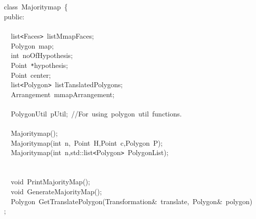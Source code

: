 \documentclass[a4paper,10pt]{article}
\begin{document}
{
\noindent \ttfamily
\jttstylea \\
\jttstylea \\
\jttstylea \\
\jttstylea \\
\jttstylee class~\jttstylek Majoritymap~\jttstylei \{\\
\jttstylee public\jttstylek :\\
\jttstylea \\
\jttstylea ~~\jttstylek list\verb#<#Faces\verb#>#~listMmapFaces;\\
\jttstylea ~~\jttstylek Polygon~map;\\
\jttstylea ~~\jttstylej int~\jttstylek noOfHypothesis;\\
\jttstylea ~~\jttstylek Point~\verb#*#hypothesis;\\
\jttstylea ~~\jttstylek Point~center;\\
\jttstylea ~~\jttstylek list\verb#<#Polygon\verb#>#~listTanslatedPolygons;\\
\jttstylea ~~\jttstylek Arrangement~mmapArrangement;\\
\jttstylea \\
\jttstylea ~~\jttstylek PolygonUtil~pUtil;~\jttstyled //For~using~polygon~util~functions.\\
\jttstylea \\
\jttstylea ~~\jttstylek Majoritymap\jttstylei ()\jttstylek ;\\
\jttstylea ~~\jttstylek Majoritymap\jttstylei (\jttstylej int~\jttstylek n,~Point~H\jttstylei []\jttstylek ,Point~c,Polygon~P\jttstylei )\jttstylek ;\\
\jttstylea ~~\jttstylek Majoritymap\jttstylei (\jttstylej int~\jttstylek n,std::list\verb#<#Polygon\verb#>#~PolygonList\jttstylei )\jttstylek ;\\
\jttstylea \\
\jttstylea \\
\jttstylea ~~\jttstylej void~\jttstylek PrintMajorityMap\jttstylei ()\jttstylek ;\\
\jttstylea ~~\jttstylej void~\jttstylek GenerateMajorityMap\jttstylei ()\jttstylek ;\\
\jttstylea ~~\jttstylek Polygon~GetTranslatePolygon\jttstylei (\jttstylek Transformation\&~translate,~Polygon\&~polygon\jttstylei )\jttstylek ;\\
}
\end{document}
